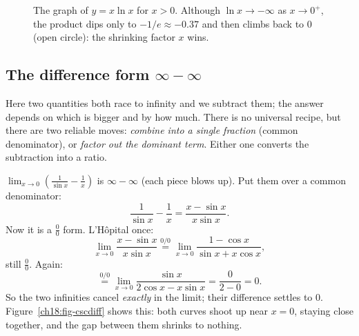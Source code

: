 \begin{figure}[htbp]
\centering
{}
\caption{The graph of $y=x\ln x$ for $x>0$. Although $\ln x\to-\infty$ as $x\to 0^+$,
the product dips only to $-1/e\approx-0.37$ and then climbs back to $0$ (open circle):
the shrinking factor $x$ wins.}
\label{ch18:fig-xlnx}
\end{figure}

\subsection{The difference form $\infty-\infty$}

Here two quantities both race to infinity and we subtract them; the answer depends on
which is bigger and by how much. There is no universal recipe, but there are two
reliable moves: \emph{combine into a single fraction} (common denominator), or
\emph{factor out the dominant term}. Either one converts the subtraction into a ratio.

\begin{example}\label{ch18:ex-cscdiff}
$\displaystyle\lim_{x\to 0}\left(\frac{1}{\sin x}-\frac{1}{x}\right)$ is
$\infty-\infty$ (each piece blows up). Put them over a common denominator:
\[
\frac{1}{\sin x}-\frac{1}{x}=\frac{x-\sin x}{x\sin x}.
\]
Now it is a $\tfrac00$ form. L'H\^opital once:
\[
\lim_{x\to 0}\frac{x-\sin x}{x\sin x}
\overset{0/0}{=}\lim_{x\to 0}\frac{1-\cos x}{\sin x+x\cos x},
\]
still $\tfrac00$. Again:
\[
\overset{0/0}{=}\lim_{x\to 0}\frac{\sin x}{2\cos x-x\sin x}
=\frac{0}{2-0}=0.
\]
So the two infinities cancel \emph{exactly} in the limit; their difference settles to
$0$. Figure~\ref{ch18:fig-cscdiff} shows this: both curves shoot up near $x=0$,
staying close together, and the gap between them shrinks to nothing.
\end{example}

